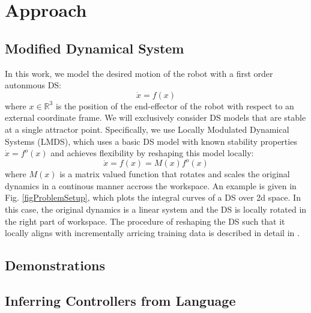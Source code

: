 

\section{Approach}
\label{sec:approach}

\subsection{Modified Dynamical System}
In this work, we model the desired motion of the robot with a first order autonmous DS:
\begin{equation}
  \label{eq:DS_general}
  \dot x = f(x)
\end{equation}
where $x \in \mathbb{R}^3$ is the position of the end-effector of the robot with respect to an external coordinate frame. We will exclusively consider DS models that are stable at a single attractor point. Specifically, we use Locally Modulated Dynamical Systems (LMDS), which uses a basic DS model with known stability properties $\dot x = f^o(x)$ and achieves flexibility by reshaping this model locally:
\begin{equation}
  \label{eq:DS_reshaped}
  \dot x = f(x) = M(x)f^o(x)
\end{equation}
where $M(x)$ is a matrix valued function that rotates and scales the original dynamics in a continous manner accross the workspace. An example is given in Fig. \ref{figProblemSetup}, which plots the integral curves of a DS over 2d space. In this case, the original dynamics is a linear system and the DS is locally rotated in the right part of workspace. The procedure of reshaping the DS such that it locally aligns with incrementally arricing training data is described in detail in . 
\subsection{Demonstrations}

\subsection{Inferring Controllers from Language}
